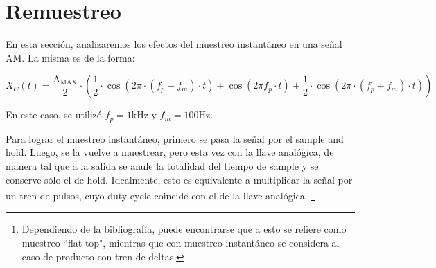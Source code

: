 \documentclass[a4paper]{article}
\begin{document}
\section{Remuestreo} \label{sec:remuestreo}

En esta secci\'on, analizaremos los efectos del muestreo instant\'aneo en una se\~nal AM. La misma es de la forma:

\begin{equation}
	X_C(t) = \frac{\mathrm{A}_\mathrm{MAX}}{2} \cdot 
	\left(  \frac{1}{2} \cdot \cos{\left( 2\pi \cdot(f_p-f_m) \cdot t\right)} +
	\cos{\left( 2\pi f_p\cdot t\right)} +
	\frac{1}{2} \cdot \cos{\left( 2\pi \cdot (f_p+f_m)\cdot t\right)}
	\right)
\end{equation}

En este caso, se utiliz\'o $f_p=1$kHz y $f_m=100$Hz.  

Para lograr el muestreo instant\'aneo, primero se pasa la se\~nal por el sample and hold. Luego, se la vuelve a muestrear, pero esta vez con la llave anal\'ogica, de manera tal que a la salida se anule la totalidad del tiempo de sample y se conserve s\'olo el de hold. Idealmente, esto es equivalente a multiplicar la se\~nal por un tren de pulsos, cuyo duty cycle coincide con el de la llave anal\'ogica. 
\footnote{Dependiendo de la bibliograf\'ia, puede encontrarse que a esto se refiere como muestreo ``flat top", mientras que con muestreo instant\'aneo se considera al caso de producto con tren de deltas.}
\end{document}
